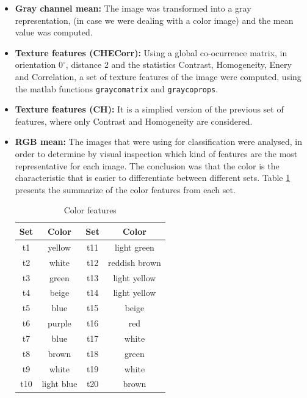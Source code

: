 \documentclass{IEEEtran}
\begin{document}
\begin{itemize}
 \item \textbf{Gray channel mean:} The image was transformed into a gray representation, (in case we were dealing with a color image) and the mean value was computed.
 \item \textbf{Texture features (CHECorr):} Using a global co-ocurrence matrix, in orientation $0^{\circ}$, distance 2 and the statistics Contrast, Homogeneity, Enery and Correlation, a set of texture features of the image were computed, using the matlab functions \texttt{graycomatrix} and \texttt{graycoprops}.
 \item \textbf{Texture features (CH):} It is a simplied version of the previous set of features, where only Contrast and Homogeneity are considered.
 \item \textbf{RGB mean:} The images that were using for classification were analysed, in order to determine by visual inspection which kind of features are the most representative for each image. The conclusion was that the color is the characteristic that is easier to differentiate between different sets. Table \ref{tb:color_features} presents the summarize of the color features from each set. 
 
\begin{table}[h!] 
\centering
\begin{tabular}{|c|c|c|c|}
\hline
\textbf{Set} & \textbf{Color} & \textbf{Set} & \textbf{Color} \\
\hline
t1 & \cellcolor{yellow!100}yellow & t11 & \cellcolor{green!25}light green \\
\hline
t2 & white & t12 & \cellcolor{brown!60}reddish brown \\
\hline
t3 & \cellcolor{green!50}green & t13 & \cellcolor{yellow!50}light yellow \\
\hline
t4 & \cellcolor{yellow!25}beige & t14 & \cellcolor{yellow!50}light yellow\\
\hline
t5 & \cellcolor{blue!100}blue & t15 & \cellcolor{yellow!25}beige \\
\hline
t6 & \cellcolor{purple!50}purple & t16 & \cellcolor{red!100}red \\
\hline
t7 & \cellcolor{blue!100}blue & t17 & white \\
\hline
t8 & \cellcolor{brown!100}brown & t18 & \cellcolor{green!100}green \\
\hline
t9 & white & t19 & white\\
\hline
t10 & \cellcolor{blue!25}light blue & t20 & \cellcolor{brown!100}brown\\
\hline
\end{tabular}
\caption{Color features}
\label{tb:color_features}
\end{table} 
 

\end{itemize}
\end{document}
